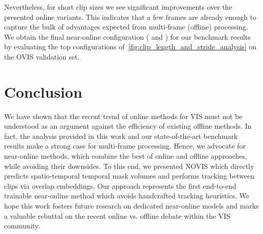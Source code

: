 \documentclass{article}
\newcommand{\method}{\mbox{NOVIS}}
\theoremstyle{plain}
\theoremstyle{definition}
\theoremstyle{remark}
\begin{document}
Nevertheless, for short clip sizes we see significant improvements over the presented online variants.
This indicates that a few frames are already enough to capture the bulk of advantages expected from multi-frame (offline) processing.
We obtain the final near-online configuration ( and ) for our benchmark results by evaluating the top configurations of~\cref{fig:clip_length_and_stride_analysis} on the OVIS validation set.

































%
 \section{Conclusion}
We have shown that the recent trend of online methods for VIS must not be understood as an argument against the efficiency of existing offline methods.
In fact, the analysis provided in this work and our state-of-the-art benchmark results make a strong case for multi-frame processing.
Hence, we advocate for near-online methods, which combine the best of online and offline approaches, while avoiding their downsides. 
To this end, we presented \method{} which directly predicts spatio-temporal temporal mask volumes and performs tracking between clips via overlap embeddings.
Our approach represents the first end-to-end trainable near-online method which avoids handcrafted tracking heuristics.
We hope this work fosters future research on dedicated near-online models and marks a valuable rebuttal on the recent online vs. offline debate within the VIS community.
 
 


 







\newpage
\appendix
\onecolumn
\end{document}

